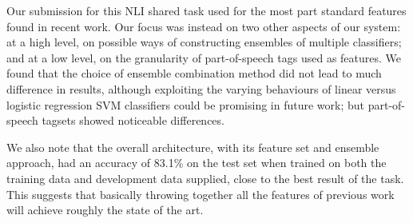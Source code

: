 Our submission for this NLI shared task used for the most part standard features found in recent work. Our focus was instead on two other aspects of
 our system: at a high level, on possible ways of constructing ensembles of
 multiple classifiers; and at a low level, on the granularity of part-of-speech
 tags used as features. We found that the choice of ensemble combination
 method did not lead to much difference in results, although exploiting the
 varying behaviours of linear versus logistic regression SVM classifiers could
 be promising in future work; but part-of-speech tagsets showed noticeable
 differences.
 
 We also note that the overall architecture, with its feature set and ensemble
 approach, had an accuracy of 83.1\% on the test set when trained on both the
 training data and development data supplied, close to the best result of the
 task. This suggests that basically throwing together all the features of
 previous work will achieve roughly the state of the art.

